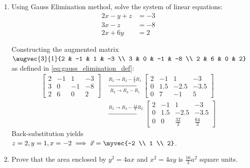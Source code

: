 \begin{enumerate}[label=\thesubsection.\arabic*, ref=\thesubsection.\theenumi]
	\item Using Gauss Elimination method, solve the system of linear equations:
	\begin{align*}
		2x - y + z &= -3 \\
		3x - z &= -8 \\
		2x + 6y &= 2
	\end{align*}
	\hfill {}
	
	\solution
	Constructing the augmented matrix $\augvec{3}{1}{2 & -1 & 1 & -3 \\ 3 & 0 & -1 & -8 \\ 2 & 6 & 0 & 2}$ as defined in \eqref{eq:gauss_elimination_def}:
	\begin{align}
		\left[\begin{array}{ccc|c}
			2 & -1 & 1 & -3 \\
			3 & 0 & -1 & -8 \\
			2 & 6 & 0 & 2
		\end{array}\right]
		&\xrightarrow[R_3 \to R_3 - R_1]{R_2 \to R_2 - \frac{3}{2}R_1}
		\left[\begin{array}{ccc|c}
			2 & -1 & 1 & -3 \\
			0 & 1.5 & -2.5 & -3.5 \\
			0 & 7 & -1 & 5
		\end{array}\right] \nonumber \\
		&\xrightarrow{R_3 \to R_3 - \frac{14}{3}R_2}
		\left[\begin{array}{ccc|c}
			2 & -1 & 1 & -3 \\
			0 & 1.5 & -2.5 & -3.5 \\
			0 & 0 & \frac{32}{3} & \frac{64}{3}
		\end{array}\right]
	\end{align}
	Back-substitution yields $z = 2, y = 1, x = -2 \implies \vec{x} = \myvec{-2 \\ 1 \\ 2}$.
	
	\item Prove that the area enclosed by $y^2 = 4ax$ and $x^2 = 4ay$ is $\frac{16}{3}a^2$ square units. \hfill {}
	

\end{enumerate}
